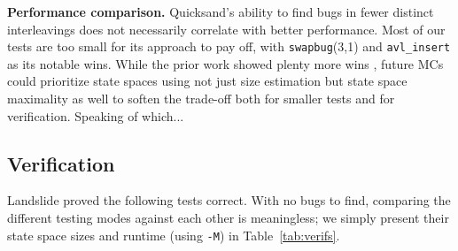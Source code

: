 \documentclass[10pt]{sigplanconf}
\begin{document}
		{\bf Performance comparison.}
		Quicksand's ability to find bugs in fewer distinct interleavings %
		does not necessarily correlate with better performance. %
		Most of our tests are too small for its approach to pay off,
		with {\tt swapbug}(3,1) and {\tt avl\_insert} as its notable wins.
		While the prior work showed plenty more wins \cite{quicksand},
		future MCs could prioritize state spaces using not just size estimation
		but state space maximality as well
		to soften the trade-off
		both for smaller tests and for verification.
Speaking of which...

\subsection{Verification}

Landslide proved the following tests correct.
With no bugs to find, comparing the different testing modes against each other is meaningless;
we simply present their state space sizes and runtime (using {\tt -M}) in Table~\ref{tab:verifs}.
\end{document}
